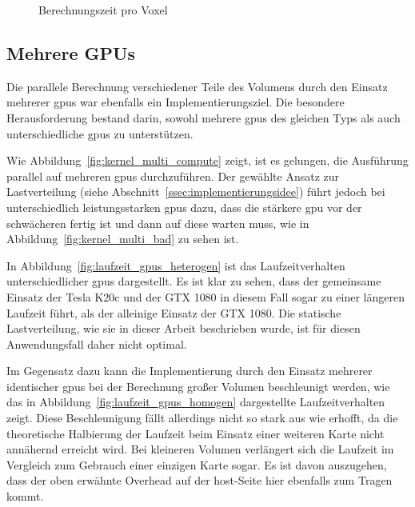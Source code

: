 \begin{figure}
    \centering
    \caption{Berechnungszeit pro Voxel}\label{fig:voxelzeit} 
\end{figure}

\subsection{Mehrere GPUs}

Die parallele Berechnung verschiedener Teile des Volumens durch den Einsatz mehrerer \gls{gpu}s war ebenfalls ein
Implementierungsziel. Die besondere Herausforderung bestand darin, sowohl mehrere \gls{gpu}s des gleichen Typs als auch
unterschiedliche \gls{gpu}s zu unterstützen.

Wie Abbildung~\ref{fig:kernel_multi_compute} zeigt, ist es gelungen, die Ausführung parallel auf mehreren \gls{gpu}s
durchzuführen. Der gewählte Ansatz zur Lastverteilung (siehe Abschnitt~\ref{ssec:implementierungsidee}) führt jedoch bei
unterschiedlich leistungsstarken \gls{gpu}s dazu, dass die stärkere \gls{gpu} vor der schwächeren fertig ist und dann
auf diese warten muss, wie in Abbildung~\ref{fig:kernel_multi_bad} zu sehen ist.

In Abbildung~\ref{fig:laufzeit_gpus_heterogen} ist das Laufzeitverhalten unterschiedlicher \gls{gpu}s dargestellt. Es
ist klar zu sehen, dass der gemeinsame Einsatz der Tesla K20c und der GTX 1080 in diesem Fall sogar zu einer längeren
Laufzeit führt, als der alleinige Einsatz der GTX 1080. Die statische Lastverteilung, wie sie in dieser Arbeit
beschrieben wurde, ist für diesen Anwendungsfall daher nicht optimal. 

Im Gegensatz dazu kann die Implementierung durch den Einsatz mehrerer identischer \gls{gpu}s bei der Berechnung großer
Volumen beschleunigt werden, wie das in Abbildung~\ref{fig:laufzeit_gpus_homogen} dargestellte Laufzeitverhalten zeigt.
Diese Beschleunigung fällt allerdings nicht so stark aus wie erhofft, da die theoretische Halbierung der Laufzeit beim
Einsatz einer weiteren Karte nicht annähernd erreicht wird. Bei kleineren Volumen verlängert sich die Laufzeit im
Vergleich zum Gebrauch einer einzigen Karte sogar. Es ist davon auszugehen, dass der oben erwähnte Overhead auf der
\gls{host}-Seite hier ebenfalls zum Tragen kommt.

